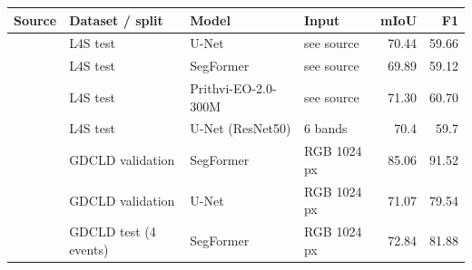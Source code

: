 \begin{tabular}{llllrr}
\toprule
Source & Dataset / split & Model & Input & mIoU & F1 \\
\midrule
\cite{li2025prithvi} & L4S test & U-Net & see source & 70.44 & 59.66 \\
\cite{li2025prithvi} & L4S test & SegFormer & see source & 69.89 & 59.12 \\
\cite{li2025prithvi} & L4S test & Prithvi-EO-2.0-300M & see source & 71.30 & 60.70 \\
\cite{szwarcman2024prithvi} & L4S test & U-Net (ResNet50) & 6 bands & 70.4 & 59.7 \\
\cite{fang2024gdcld} & GDCLD validation & SegFormer & RGB 1024 px & 85.06 & 91.52 \\
\cite{fang2024gdcld} & GDCLD validation & U-Net & RGB 1024 px & 71.07 & 79.54 \\
\cite{fang2024gdcld} & GDCLD test (4 events) & SegFormer & RGB 1024 px & 72.84 & 81.88 \\
\bottomrule
\end{tabular}
